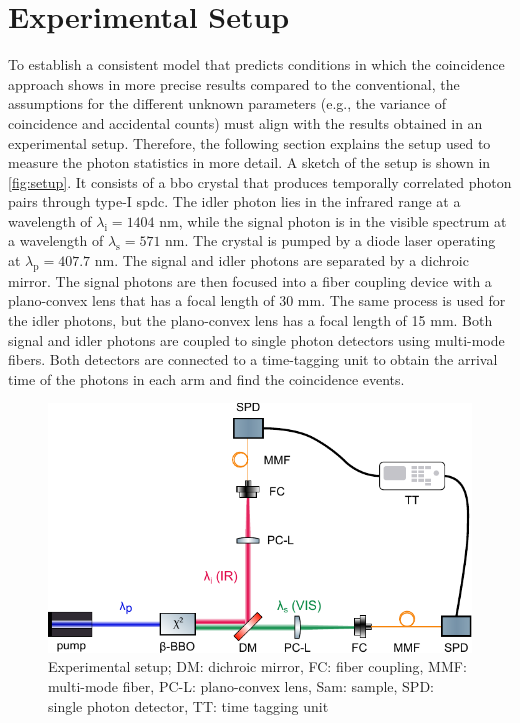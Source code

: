 \section{Experimental Setup}
To establish a consistent model that predicts conditions in which the coincidence approach shows in more precise results compared to the conventional, the assumptions for the different unknown parameters (e.g., the variance of coincidence and accidental counts) must align with the results obtained in an experimental setup. Therefore, the following section explains the setup used to measure the photon statistics in more detail. \newline
A sketch of the setup is shown in \autoref{fig:setup}. It consists of a \acrshort{bbo} crystal that produces temporally correlated photon pairs through type-I \acrshort{spdc}. The idler photon lies in the infrared range at a wavelength of $\lambda_{\text{i}} = 1404$ nm, while the signal photon is in the visible spectrum at a wavelength of $\lambda_{\text{s}} = 571$ nm. The crystal is pumped by a diode laser operating at $\lambda_{\text{p}} = 407.7$ nm. \newline
The signal and idler photons are separated by a dichroic mirror. The signal photons are then focused into a fiber coupling device with a plano-convex lens that has a focal length of 30 mm. The same process is used for the idler photons, but the plano-convex lens has a focal length of 15 mm. \newline
Both signal and idler photons are coupled to single photon detectors using multi-mode fibers. Both detectors are connected to a time-tagging unit to obtain the arrival time of the photons in each arm and find the coincidence events.  
\begin{figure}[tb!]
    \centering
    \includegraphics[width=.8\linewidth]{Images/DupishSetupNew.pdf}
    \caption[Experimental setup]{Experimental setup; DM: dichroic mirror, FC: fiber coupling, MMF: multi-mode fiber, PC-L: plano-convex lens, Sam: sample, SPD: single photon detector, TT: time tagging unit}
    \label{fig:setup}
\end{figure}

